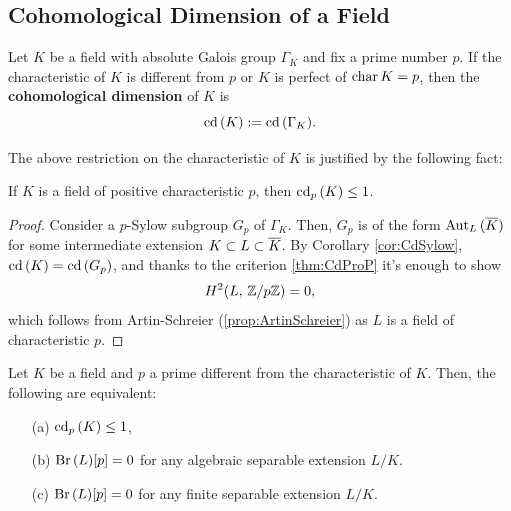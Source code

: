 \documentclass[a4paper, oneside]{memoir}
\begin{document}
\subsection{Cohomological Dimension of a Field}

\begin{definition}
	Let $K$ be a field with absolute Galois group $\Gamma_K$ and fix a prime number $p$. If the characteristic of $K$ is different from $p$ or $K$ is perfect of $\operatorname{char}{K}=p$, then the \textbf{cohomological dimension} of $K$ is
	\[
		\operatorname{cd}{(K)}:=\operatorname{cd}{(\Gamma_K)}.
	\]
\end{definition}

The above restriction on the characteristic of $K$ is justified by the following fact:

\begin{proposition}\label{prop:CdCharP}
	If $K$ is a field of positive characteristic $p$, then $\operatorname{cd}_p{(K)}\leq 1$.
\end{proposition}

\begin{proof}
	Consider a $p$-Sylow subgroup $G_p$ of $\Gamma_K$. Then, $G_p$ is of the form $\operatorname{Aut}_L{(\overline{K})}$ for some intermediate extension $K\subset L\subset \overline{K}$. By Corollary \ref{cor:CdSylow}, $\operatorname{cd}{(K)}=\operatorname{cd}{(G_p)}$, and thanks to the criterion \ref{thm:CdProP} it's enough to show
	\[
		H^{2}( L, \, \mathbb{Z}/{p\mathbb{Z}} )=0,
	\]
	which follows from Artin-Schreier (\ref{prop:ArtinSchreier}) as $L$ is a field of characteristic $p$.
\end{proof}

\begin{proposition}\label{prop:CdBr}
	Let $K$ be a field and $p$ a prime different from the characteristic of $K$. Then, the following are equivalent:
	\begin{itemize}
		\item[(a)] $\operatorname{cd}_p{(K)}\leq 1$,
		\item[(b)] $\operatorname{Br}{(L)}[p]=0$ for any algebraic separable extension $L/K$.
		\item[(c)] $\operatorname{Br}{(L)}[p]=0$ for any finite separable extension $L/K$.
	\end{itemize}
\end{proposition}
\end{document}

